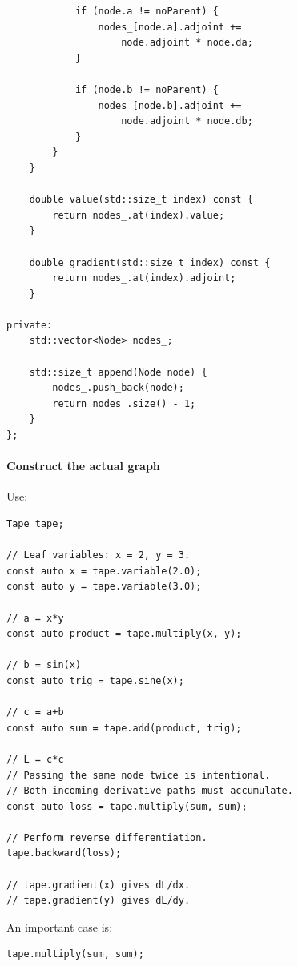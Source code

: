 \begin{verbatim}
            if (node.a != noParent) {
                nodes_[node.a].adjoint +=
                    node.adjoint * node.da;
            }

            if (node.b != noParent) {
                nodes_[node.b].adjoint +=
                    node.adjoint * node.db;
            }
        }
    }

    double value(std::size_t index) const {
        return nodes_.at(index).value;
    }

    double gradient(std::size_t index) const {
        return nodes_.at(index).adjoint;
    }

private:
    std::vector<Node> nodes_;

    std::size_t append(Node node) {
        nodes_.push_back(node);
        return nodes_.size() - 1;
    }
};
\end{verbatim}

\paragraph{Construct the actual graph}\label{02-foundations-ii-ch022-construct-the-actual-graph}

\hypertarget{02-foundations-ii-ch022-construct-the-actual-graph}{}

Use:

\begin{verbatim}
Tape tape;

// Leaf variables: x = 2, y = 3.
const auto x = tape.variable(2.0);
const auto y = tape.variable(3.0);

// a = x*y
const auto product = tape.multiply(x, y);

// b = sin(x)
const auto trig = tape.sine(x);

// c = a+b
const auto sum = tape.add(product, trig);

// L = c*c
// Passing the same node twice is intentional.
// Both incoming derivative paths must accumulate.
const auto loss = tape.multiply(sum, sum);

// Perform reverse differentiation.
tape.backward(loss);

// tape.gradient(x) gives dL/dx.
// tape.gradient(y) gives dL/dy.
\end{verbatim}

An important case is:

\begin{verbatim}
tape.multiply(sum, sum);
\end{verbatim}

